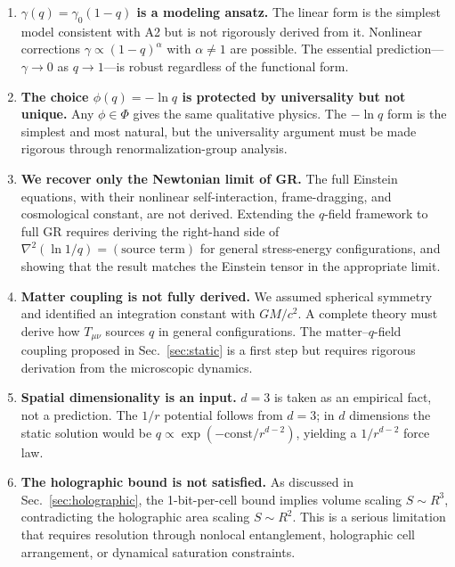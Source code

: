 \documentclass[aps,prd,twocolumn,showpacs,superscriptaddress,preprintnumbers]{revtex4-2}
\begin{document}
\begin{enumerate}
    \item \textbf{$\gamma(q)=\gamma_0(1-q)$ is a modeling ansatz.} The linear form is the simplest model consistent with A2 but is not rigorously derived from it. Nonlinear corrections $\gamma\propto(1-q)^\alpha$ with $\alpha\neq1$ are possible. The essential prediction---$\gamma\to0$ as $q\to1$---is robust regardless of the functional form.

    \item \textbf{The choice $\phi(q)=-\ln q$ is protected by universality but not unique.} Any $\phi\in\Phi$ gives the same qualitative physics. The $-\ln q$ form is the simplest and most natural, but the universality argument must be made rigorous through renormalization-group analysis.

    \item \textbf{We recover only the Newtonian limit of GR.} The full Einstein equations, with their nonlinear self-interaction, frame-dragging, and cosmological constant, are not derived. Extending the $q$-field framework to full GR requires deriving the right-hand side of $\nabla^2(\ln 1/q)=(\text{source term})$ for general stress-energy configurations, and showing that the result matches the Einstein tensor in the appropriate limit.

    \item \textbf{Matter coupling is not fully derived.} We assumed spherical symmetry and identified an integration constant with $GM/c^2$. A complete theory must derive how $T_{\mu\nu}$ sources $q$ in general configurations. The matter--$q$-field coupling proposed in Sec.~\ref{sec:static} is a first step but requires rigorous derivation from the microscopic dynamics.

    \item \textbf{Spatial dimensionality is an input.} $d=3$ is taken as an empirical fact, not a prediction. The $1/r$ potential follows from $d=3$; in $d$ dimensions the static solution would be $q\propto\exp(-\text{const}/r^{d-2})$, yielding a $1/r^{d-2}$ force law.

    \item \textbf{The holographic bound is not satisfied.} As discussed in Sec.~\ref{sec:holographic}, the 1-bit-per-cell bound implies volume scaling $S\sim R^3$, contradicting the holographic area scaling $S\sim R^2$. This is a serious limitation that requires resolution through nonlocal entanglement, holographic cell arrangement, or dynamical saturation constraints.


\end{enumerate}
\end{document}
